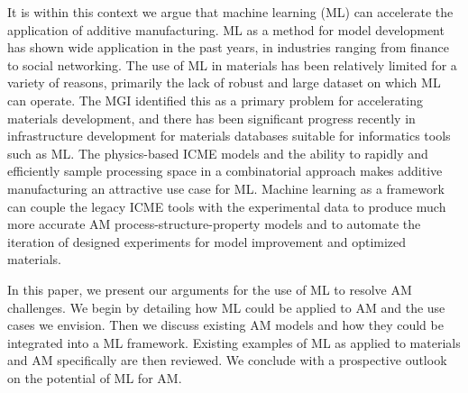 It is within this context we argue that machine learning (ML) can accelerate the application of additive manufacturing.
ML as a method for model development has shown wide application in the past years, in industries ranging from finance to social networking.
The use of ML in materials has been relatively limited for a variety of reasons, primarily the lack of  robust and large dataset on which ML can operate.
The MGI identified this as a primary problem for accelerating materials development, and there has been significant progress recently in infrastructure development for materials databases suitable for informatics tools such as ML. 
The  physics-based ICME models and the ability to rapidly and efficiently sample processing space in a combinatorial approach makes additive manufacturing an attractive use case for ML.
Machine learning as a framework can couple the legacy ICME tools with the experimental data to produce much more accurate AM process-structure-property models and to automate the iteration of designed experiments for model improvement and optimized materials.

In this paper, we present our arguments for the use of ML to resolve AM challenges.
We begin by detailing how ML could be applied to AM and the use cases we envision.
Then we discuss existing AM models and how they could be integrated into a ML framework.
Existing examples of ML as applied to materials and AM specifically are then reviewed.
We conclude with a prospective outlook on the potential of ML for AM.



